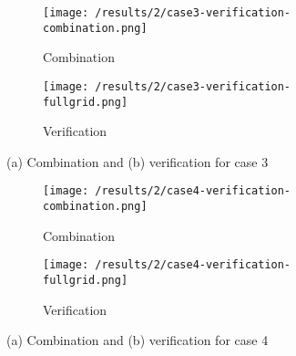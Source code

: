 \begin{figure}[h]
	\centering
    \begin{subfigure}[b]{0.49\textwidth}
	    \texttt{[image: /results/2/case3-verification-combination.png]}
		\centering
        \label{fig:results2case3Combi}
        \caption{Combination}
    \end{subfigure} 
    \begin{subfigure}[b]{0.49\textwidth}    
	    \texttt{[image: /results/2/case3-verification-fullgrid.png]}
		\centering    
	 \caption{Verification}
	    \label{fig:results2case3Full}	 	 
    \end{subfigure} 
    \caption{(a) Combination and (b) verification for case 3}
    \label{fig:results2case3}
\end{figure}
\begin{figure}[h!]
	\centering
    \begin{subfigure}[b]{0.49\textwidth}
	    \texttt{[image: /results/2/case4-verification-combination.png]}
		\centering
        \label{fig:results2case4Combi}
        \caption{Combination}
    \end{subfigure} 
    \begin{subfigure}[b]{0.49\textwidth}    
	    \texttt{[image: /results/2/case4-verification-fullgrid.png]}
		\centering    
	 \caption{Verification}
	    \label{fig:results2case4Full}	 	 
    \end{subfigure} 
    \caption{(a) Combination and (b) verification for case 4}
    \label{fig:results2case4}
\end{figure}

